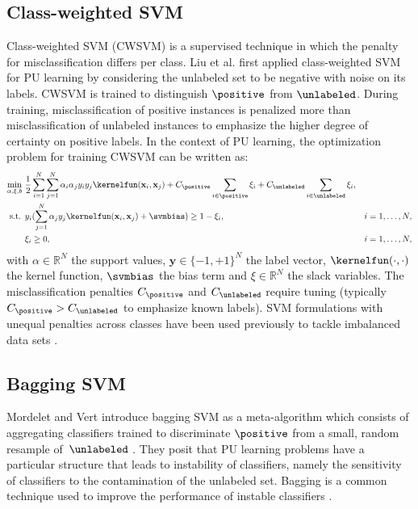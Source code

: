 \subsection{Class-weighted SVM} \label{bsvm}
Class-weighted SVM (CWSVM) is a supervised technique in which the penalty for misclassification differs per class. Liu et al. \citep{Liu:2003:BTC:951949.952139} first applied class-weighted SVM for PU learning by considering the unlabeled set to be negative with noise on its labels. CWSVM is trained to distinguish $\positive$ from $\unlabeled$. During training, misclassification of positive instances is penalized more than misclassification of unlabeled instances to emphasize the higher degree of certainty on positive labels. In the context of PU learning, the optimization problem for training CWSVM can be written as:
\begin{align}
\min_{\alpha,\xi,b}\ & \frac{1}{2}\sum_{i=1}^N\sum_{j=1}^N \alpha_i\alpha_j y_i y_j \kernelfun(\mathbf{x}_i,\mathbf{x}_j)+C_{\positive}\sum_{i \in\positive} \xi_i + C_{\unlabeled}\sum_{i\in\unlabeled} \xi_i, \label{eq:bsvm} \\
\text{s.t. } &y_i(\sum_{j=1}^N \alpha_j y_j \kernelfun(\mathbf{x}_i,\mathbf{x}_j)+\svmbias)\geq 1-\xi_i, &i=1,\ldots,N, \nonumber \\
&\xi_i \geq 0, &i=1,\ldots,N, \nonumber
\end{align}
with $\alpha \in \mathbb{R}^N$ the support values, $\mathbf{y} \in \{-1,+1\}^N$ the label vector, $\kernelfun(\cdot,\cdot)$ the kernel function, $\svmbias$ the bias term and $\xi \in \mathbb{R}^N$ the slack variables. The misclassification penalties $C_{\positive}$ and $C_{\unlabeled}$ require tuning (typically $C_{\positive} > C_{\unlabeled}$ to emphasize known labels). SVM formulations with unequal penalties across classes have been used previously to tackle imbalanced data sets \citep{osuna1997}. 

\subsection{Bagging SVM} \label{baggingsvm}
Mordelet and Vert introduce bagging SVM as a meta-algorithm which consists of aggregating classifiers trained to discriminate $\positive$ from a small, random resample of\ $\unlabeled$ \citep{mordelet2014bagging}. They posit that PU learning problems have a particular structure that leads to instability of classifiers, namely the sensitivity of classifiers to the contamination of the unlabeled set.  Bagging is a common technique used to improve the performance of instable classifiers \citep{Breiman:1996:BP:231986.231989}.

